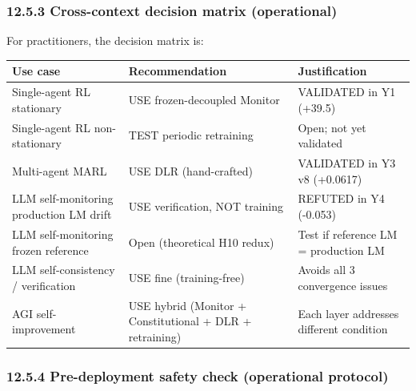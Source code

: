 \documentclass[11pt]{article}
\begin{document}
\subsubsection{12.5.3 Cross-context decision matrix
(operational)}\label{cross-context-decision-matrix-operational}

For practitioners, the decision matrix is:

{\def\LTcaptype{none} %
\begin{longtable}[]{@{}
  >{\raggedright\arraybackslash}p{}
  >{\raggedright\arraybackslash}p{}
  >{\raggedright\arraybackslash}p{}@{}}
\toprule\noalign{}
\begin{minipage}[b]{\linewidth}\raggedright
Use case
\end{minipage} & \begin{minipage}[b]{\linewidth}\raggedright
Recommendation
\end{minipage} & \begin{minipage}[b]{\linewidth}\raggedright
Justification
\end{minipage} \\
\midrule\noalign{}
\endhead
\bottomrule\noalign{}
\endlastfoot
Single-agent RL stationary & USE frozen-decoupled Monitor & VALIDATED in
Y1 (+39.5) \\
Single-agent RL non-stationary & TEST periodic retraining & Open; not
yet validated \\
Multi-agent MARL & USE DLR (hand-crafted) & VALIDATED in Y3 v8
(+0.0617) \\
LLM self-monitoring production LM drift & USE verification, NOT training
& REFUTED in Y4 (-0.053) \\
LLM self-monitoring frozen reference & Open (theoretical H10 redux) &
Test if reference LM = production LM \\
LLM self-consistency / verification & USE fine (training-free) & Avoids
all 3 convergence issues \\
AGI self-improvement & USE hybrid (Monitor + Constitutional + DLR +
retraining) & Each layer addresses different condition \\
\end{longtable}
}

\subsubsection{12.5.4 Pre-deployment safety check (operational
protocol)}\label{pre-deployment-safety-check-operational-protocol}
\end{document}
